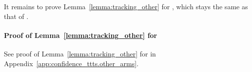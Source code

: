It remains to prove Lemma~\ref{lemma:tracking_other} for \TCC, which stays the same as that of \TTTS.

\paragraph{Proof of Lemma~\ref{lemma:tracking_other} for \TCC} 

See proof of Lemma~\ref{lemma:tracking_other} for \TTTS in Appendix~\ref{app:confidence_ttts.other_arms}.

\hfill\BlackBox\\[2mm]

